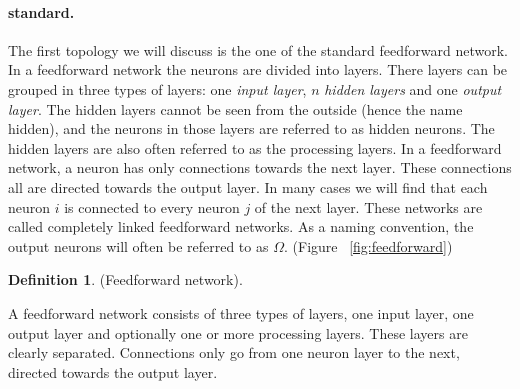 \documentclass[pdftex,a4paper,12pt,twoside]{report}
\theoremstyle{plain} \newtheorem{theorem}{Theorem} \newtheorem{proposition}{Proposition} \newtheorem{lemma}{Lemma} \newtheorem*{corollary}{Corollary}
\theoremstyle{definition} \newtheorem{definition}{Definition} \newtheorem{conjecture}{Conjecture} \newtheorem*{example}{Example} \newtheorem{algorithm}{Algorithm}
\theoremstyle{remark} \newtheorem*{remark}{Remark} \newtheorem*{note}{Note} \newtheorem{case}{Case}
\begin{document}
\paragraph{standard.\label{par:feedforward}} The first topology we will discuss is the one of the standard feedforward network. In a feedforward network the neurons are divided into layers. There layers can be grouped in three types of layers: one \emph{input layer}, $n$ \emph{hidden layers} and one \emph{output layer}. The hidden layers cannot be seen from the outside (hence the name hidden), and the neurons in those layers are referred to as hidden neurons. The hidden layers are also often referred to as the processing layers. In a feedforward network, a neuron has only connections towards the next layer. These connections all are directed towards the output layer. In many cases we will find that each neuron $i$ is connected to every neuron $j$ of the next layer. These networks are called completely linked feedforward networks. As a naming convention, the output neurons will often be referred to as $\Omega$. (Figure ~\ref{fig:feedforward})
\begin{definition}
(Feedforward network). 
\end{definition} A feedforward network consists of three types of layers, one input layer, one output layer and optionally one or more processing layers. These layers are clearly separated. Connections only go from one neuron layer to the next, directed towards the output layer.
\end{document}
